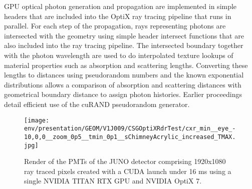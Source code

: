 \documentclass{webofc}
\begin{document}
GPU optical photon generation and propagation are implemented in simple headers that are included
into the OptiX ray tracing pipeline that runs in parallel. 
For each step of the propagation, rays representing photons are intersected
with the geometry using simple header intersect functions that are also included into the ray tracing pipeline.
The intersected boundary together with the photon wavelength are used to do interpolated texture lookups of
material properties such as absorption and scattering lengths.
Converting these lengths to distances using pseudorandom numbers and 
the known exponential distributions allows a comparison of absorption and scattering distances 
with geometrical boundary distance to assign photon histories. 
Earlier proceedings\cite{chep2016} detail efficient use of the cuRAND\cite{curandURL} pseudorandom generator.
%
%
\begin{figure}
\centering
\texttt{[image: env/presentation/GEOM/V1J009/CSGOptiXRdrTest/cxr\_min\_\_eye\_-10,0,0\_\_zoom\_0p5\_\_tmin\_0p1\_\_sChimneyAcrylic\_increased\_TMAX.jpg]}
\caption{Render of the PMTs of the JUNO detector comprising 1920x1080 ray traced pixels created with a CUDA launch under 16 ms 
using a single NVIDIA TITAN RTX GPU and NVIDIA OptiX 7.
\label{j1808}}
\vspace{-5mm}
\end{figure}
%
\end{document}
